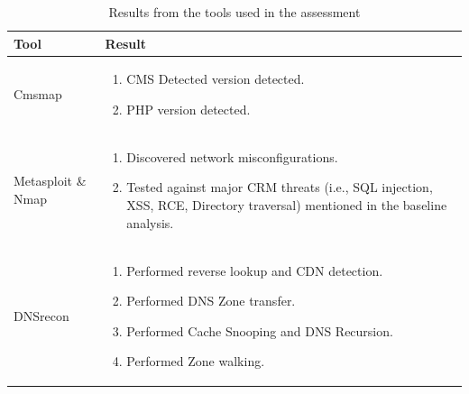 \newpage
\begingroup
\centering
\setlength{\tabcolsep}{6.5pt} %
\renewcommand{\arraystretch}{1.8} %
\begin{longtable}{ |p{5cm}| p{10cm} |}
\caption{Results from the tools used in the assessment}
    \label{table:tools}
\hline
\rowcolor{grey!15}
\textbf{Tool}  & \textbf{Result}\\
\hline
Cmsmap &  \begin{enumerate}
    \item CMS Detected version detected.
    \item PHP version detected.
\end{enumerate}\\
\hline
Metasploit \& Nmap &  \begin{enumerate}
    \item Discovered network misconfigurations.
    \item Tested against major CRM threats (i.e., SQL injection, XSS, RCE, Directory traversal) mentioned in the baseline analysis.
\end{enumerate}\\
\hline
DNSrecon &  \begin{enumerate}
    \item Performed reverse lookup and CDN detection.
    \item Performed DNS Zone transfer.
    \item Performed Cache Snooping and DNS Recursion.
    \item Performed Zone walking.
\end{enumerate}\\
\hline
\end{longtable}
\endgroup